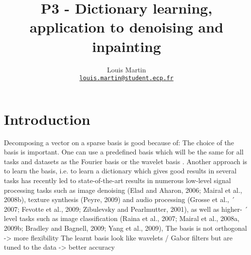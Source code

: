 \documentclass[a4paper,11pt]{article}
\title{P3 - Dictionary learning, application to denoising and inpainting}
\author{
  Louis Martin\\
  \href{mailto:louis.martin@student.ecp.fr}{\tt louis.martin@student.ecp.fr}
}
\begin{document}
\maketitle
\pagebreak

\begin{abstract}

\end{abstract}

\section{Introduction}

Decomposing a vector on a sparse basis is good because of: 
The choice of the basis is important.
One can use a predefined basis which will be the same for all tasks and datasets as the Fourier basis or the wavelet basis \cite{mallat1999}.
Another approach is to learn the basis, i.e. to learn a dictionary which gives good results in several tasks has 
recently led to state-of-the-art
results in numerous low-level signal processing tasks such as image denoising (Elad and Aharon,
2006; Mairal et al., 2008b), texture synthesis (Peyre, 2009) and audio processing (Grosse et al., ´
2007; Fevotte et al., 2009; Zibulevsky and Pearlmutter, 2001), as well as higher- ´ level tasks such as
image classification (Raina et al., 2007; Mairal et al., 2008a, 2009b; Bradley and Bagnell, 2009;
Yang et al., 2009),
The basis is not orthogonal -> more flexibility
The learnt basis look like wavelets / Gabor filters but are tuned to the data -> better accuracy
\end{document}
